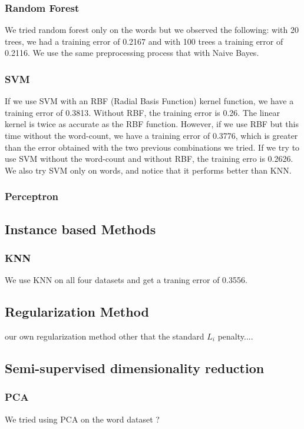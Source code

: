 \documentclass[11pt,twocolumn]{report}
\begin{document}
     \subsubsection{Random Forest}
     We tried random forest only on the words but we observed the following: with 20 trees, we had a training error of 0.2167 and with 100 trees a training error of 0.2116. We use the same preprocessing process that with Naive Bayes.  
    \subsubsection{SVM}
    
    If we use SVM with an RBF (Radial Basis Function) kernel function, we have a training error of 0.3813. Without RBF, the training error is 0.26. The linear kernel is twice as accurate as the RBF function. However, if we use RBF but this time without the word-count, we have a training error of 0.3776, which is greater than the error obtained with the two previous combinations we tried. If we try to use SVM without the word-count and without RBF, the training erro is 0.2626. We also try SVM only on words, and notice that it performs better than KNN.
    
    \subsubsection*{Perceptron}
    
    \subsection*{Instance based Methods}
    \subsubsection{KNN}
    
    We use KNN on all four datasets and get a traning error of 0.3556.
   
    \subsection*{Regularization Method}
    our own regularization method other that the standard $L_i$ penalty....
    \subsection*{Semi-supervised dimensionality reduction}
    \subsubsection*{PCA}
    We tried using PCA on the word dataset ?
\end{document}
